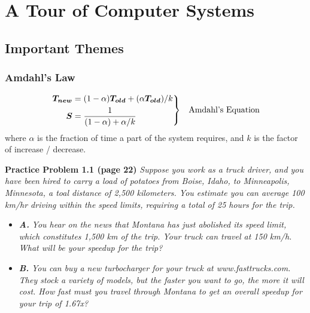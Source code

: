 \documentclass[a4paper]{report}
\newenvironment{rcase}
{\left.\begin{aligned}}
{\end{aligned}\right\rbrace}
\begin{document}
\chapter{A Tour of Computer Systems}
\setcounter{section}{8}
\section{Important Themes}
\subsection{Amdahl's Law}
	\begin{equation}
		\begin{rcase}
		\bm{T_{new}} &= (1 - \alpha)\bm{T_{old}} + (\alpha\bm{T_{old}}) / k	\\ 
		\bm{S} &= \frac{1}{(1 - \alpha) + \alpha/k} \label{1}
		\end{rcase}
		\quad \text{Amdahl's Equation}
	\end{equation}
	where $\alpha$ is the fraction of time a part of the system requires, and $k$ is the factor of increase / decrease.

\textbf{Practice Problem 1.1 (page 22)} \textit{Suppose you work as a truck driver, and you have been hired to carry a load of potatoes from Boise, Idaho, to Minneapolis, Minnesota, a toal distance of 2,500 kilometers. You estimate you can average 100 km/hr driving within the speed limits, requiring a total of 25 hours for the trip.}
\begin{itemize}
	\item \textbf{\textit{A.}}  \textit{You hear on the news that Montana has just abolished its speed limit, which constitutes 1,500 km of the trip. Your truck can travel at 150 km/h. What will be your speedup for the trip?}
	\item \textbf{\textit{B.}}  \textit{You can buy a new turbocharger for your truck at www.fasttrucks.com. They stock a variety of models, but the faster you want to go, the more it will cost. How fast must you travel through Montana to get an overall speedup for your trip of 1.67x?}
\end{itemize} 
\end{document}
